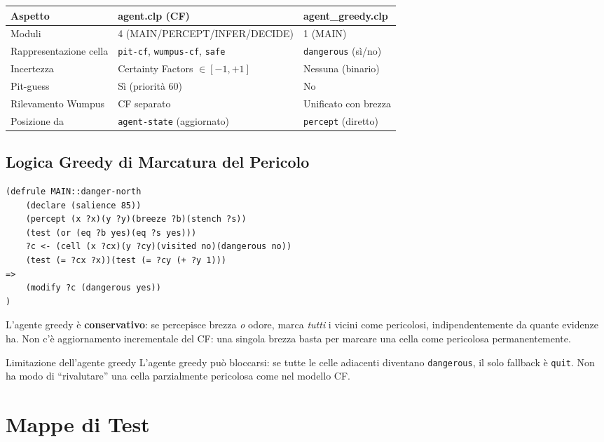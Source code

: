 \documentclass[12pt,a4paper]{article}
\begin{document}
\begin{center}
\begin{tabular}{lll}
\toprule
\textbf{Aspetto} & \textbf{agent.clp (CF)} & \textbf{agent\_greedy.clp} \\
\midrule
Moduli & 4 (MAIN/PERCEPT/INFER/DECIDE) & 1 (MAIN) \\
Rappresentazione cella & \texttt{pit-cf}, \texttt{wumpus-cf}, \texttt{safe} & \texttt{dangerous} (sì/no) \\
Incertezza & Certainty Factors $\in [-1,+1]$ & Nessuna (binario) \\
Pit-guess & Sì (priorità 60) & No \\
Rilevamento Wumpus & CF separato & Unificato con brezza \\
Posizione da & \texttt{agent-state} (aggiornato) & \texttt{percept} (diretto) \\
\bottomrule
\end{tabular}
\end{center}

\subsection{Logica Greedy di Marcatura del Pericolo}

\begin{lstlisting}
(defrule MAIN::danger-north
    (declare (salience 85))
    (percept (x ?x)(y ?y)(breeze ?b)(stench ?s))
    (test (or (eq ?b yes)(eq ?s yes)))
    ?c <- (cell (x ?cx)(y ?cy)(visited no)(dangerous no))
    (test (= ?cx ?x))(test (= ?cy (+ ?y 1)))
=>
    (modify ?c (dangerous yes))
)
\end{lstlisting}

L'agente greedy è \textbf{conservativo}: se percepisce brezza \emph{o} odore,
marca \emph{tutti} i vicini come pericolosi, indipendentemente da quante
evidenze ha. Non c'è aggiornamento incrementale del CF: una singola brezza
basta per marcare una cella come pericolosa permanentemente.

\begin{warnbox}{Limitazione dell'agente greedy}
L'agente greedy può bloccarsi: se tutte le celle adiacenti diventano
\texttt{dangerous}, il solo fallback è \texttt{quit}. Non ha modo di
``rivalutare'' una cella parzialmente pericolosa come nel modello CF.
\end{warnbox}

\section{Mappe di Test}
\end{document}
